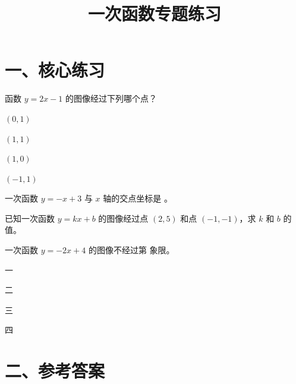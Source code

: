 \documentclass{exam-zh}
\newcommand{\answerarea}[1][40mm]{%
  \vspace{3mm}%
  \begin{tcolorbox}[
    colback=white,
    colframe=black!30,
    boxrule=1pt,
    arc=0pt,
    height=#1,
    valign=top,
  ]
  \end{tcolorbox}%
}
\begin{document}
\title{一次函数专题练习}
\subject{%
  图像与解析式 · 八年级 · 数学}
\maketitle

\section*{一、核心练习}


\begin{question}[points=4]
  函数 $y=2x-1$ 的图像经过下列哪个点？
  \begin{choices}
    \item $(0,1)$
    \item $(1,1)$
    \item $(1,0)$
    \item $(-1,1)$
  \end{choices}
\end{question}




\begin{question}[points=4]
  一次函数 $y=-x+3$ 与 $x$ 轴的交点坐标是 \underline{\hspace{2cm}}。
  \fillin
\end{question}




\begin{problem}[points=8]
  已知一次函数 $y=kx+b$ 的图像经过点 $(2,5)$ 和点 $(-1,-1)$，求 $k$ 和 $b$ 的值。
  \answerarea[45mm]
\end{problem}




\begin{question}[points=4]
  一次函数 $y=-2x+4$ 的图像不经过第 \underline{\hspace{1cm}} 象限。
  \begin{choices}
    \item 一
    \item 二
    \item 三
    \item 四
  \end{choices}
\end{question}



\clearpage
\section*{二、参考答案}
\end{document}
